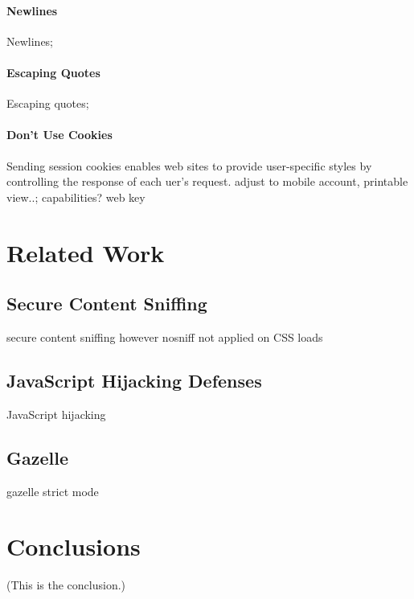 \documentclass{acm_proc_article-sp}
\begin{document}
\paragraph{Newlines}
Newlines;
\paragraph{Escaping Quotes}
Escaping quotes;

\paragraph{Don't Use Cookies}
Sending session cookies enables web sites to provide user-specific styles by controlling the response of each uer's request.
adjust to mobile account, printable view..;
capabilities? web key


\section{Related Work}

\subsection{Secure Content Sniffing}
secure content sniffing\cite{securecontentsniffing}
however nosniff not applied on CSS loads

\subsection{JavaScript Hijacking Defenses}
JavaScript hijacking\cite{jshijacking}

\subsection{Gazelle}
gazelle\cite{gazelle}
strict mode

\section{Conclusions}
(This is the conclusion.)



\end{document}
